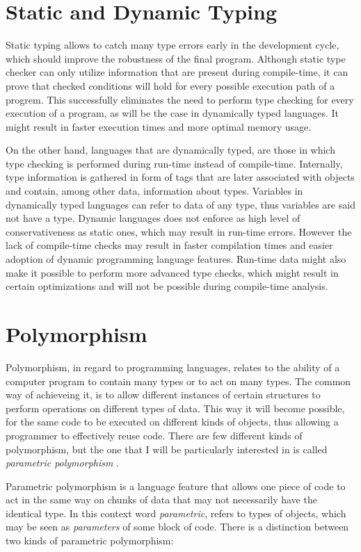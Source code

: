 \documentclass[12pt,a4paper]{report}
\begin{document}
\section{Static and Dynamic Typing}
Static typing allows to catch many type errors early in the development cycle,
which should improve the robustness of the final program. Although static type
checker can only utilize information that are present during compile-time, it
can prove that checked conditions will hold for every possible execution path
of a progrem. This successfully eliminates the need to perform type checking
for every execution of a program, as will be the case in dynamically typed
languages. It might result in faster execution times and more optimal memory
usage.

On the other hand, languages that are dynamically typed, are those in which
type checking is performed during run-time instead of compile-time. Internally,
type information is gathered in form of tags that are later associated with
objects and contain, among other data, information about types. Variables in
dynamically typed languages can refer to data of any type, thus variables are
said not have a type. Dynamic languages does not enforce as high level of
conservativeness as static ones, which may result in run-time errors. However
the lack of compile-time checks may result in faster compilation times and
easier adoption of dynamic programming language features. Run-time data might
also make it possible to perform more advanced type checks, which might result
in certain optimizations and will not be possible during compile-time
analysis.
\section{Polymorphism}
Polymorphism, in regard to programming languages, relates to the ability of a
computer program to contain many types or to act on many types. The common way
of achieveing it, is to allow different instances of certain structures to
perform operations on different types of data. This way it will become
possible, for the same code to be executed on different kinds of objects, thus
allowing a programmer to effectively reuse code. There are few different kinds
of polymorphism, but the one that I will be particularly interested in is
called \textit{parametric polymorphism} \cite{Car88}.

Parametric polymorphism is a language feature that allows one piece of code to
act in the same way on chunks of data that may not necessarily have the
identical type. In this context word \textit{parametric}, refers to types of
objects, which may be seen as \textit{parameters} of some block of code. There is a
distinction between two kinds of parametric polymorphism:
\end{document}
